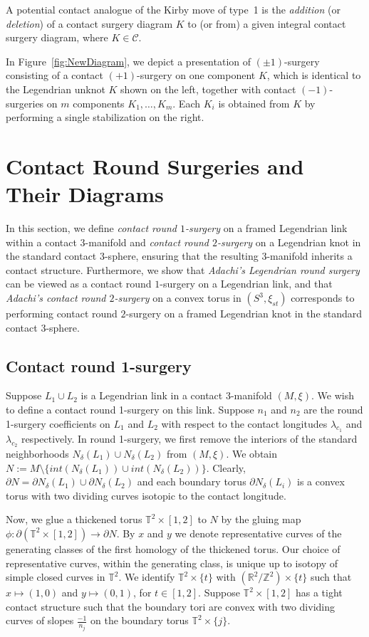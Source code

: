 \documentclass{amsart}
\theoremstyle{plain}
\theoremstyle{remark}
\theoremstyle{definition}
\newcommand{\dd}{\partial}
\begin{document}
A potential contact analogue of the Kirby move of type~1 is the \textit{addition} (or \textit{deletion}) of a contact surgery diagram $K$ to (or from) a given integral contact surgery diagram, where $K \in \mathcal{C}$.


In Figure~\ref{fig:NewDiagram}, we depict a presentation of $(\pm1)$-surgery  consisting of a contact $(+1)$-surgery on one component $K$, which is identical to the Legendrian unknot $K$ shown on the left, together with contact $(-1)$-surgeries on $m$ components $K_1, \ldots, K_m$. 
Each $K_i$ is obtained from $K$ by performing a single stabilization on the right.

\section{Contact Round Surgeries and Their Diagrams}\label{sec: ContSurDia}
In this section, we define \emph{contact round $1$-surgery} on a framed Legendrian link within a contact $3$-manifold and \emph{contact round $2$-surgery} on a Legendrian knot in the standard contact $3$-sphere, ensuring that the resulting $3$-manifold inherits a contact structure. 
Furthermore, we show that \emph{Adachi’s Legendrian round surgery} can be viewed as a contact round $1$-surgery on a Legendrian link, and that \emph{Adachi’s contact round $2$-surgery} on a convex torus in $(S^3, \xi_{st})$ corresponds to performing contact round $2$-surgery on a framed Legendrian knot in the standard contact $3$-sphere.

\subsection{Contact round 1-surgery}\label{subsec: CR1S}
Suppose $L_1 \cup L_2$ is a Legendrian link in a contact 3-manifold $(M, \xi)$. 
We wish to define a contact round 1-surgery on this link. 
Suppose $n_1$ and $n_2$ are the round 1-surgery coefficients on $L_1$ and $L_2$ with respect to the contact longitudes $\lambda_{c_1}$ and $\lambda_{c_2}$ respectively. 
In round 1-surgery, we first remove the interiors of the standard neighborhoods $N_{\delta}(L_1)\cup N_{\delta}(L_2)$ from $(M, \xi)$.
We obtain $N:= M \setminus \{ int(N_{\delta}(L_1))\cup int(N_{\delta}(L_2))\} $. 
Clearly, $\dd N = \dd N_{\delta}(L_1) \cup \dd N_{\delta}(L_2)$ and each boundary torus $\dd N_{\delta}(L_i)$ is a convex torus with two dividing curves isotopic to the contact longitude.


Now, we glue a thickened torus $\mathbb{T}^2 \times [1,2]$ to $N$ by the gluing map $\phi: \dd(\mathbb{T}^2\times [1,2]) \to \dd N$.
By $x$ and $y$ we denote representative curves of the generating classes of the first homology of the thickened torus. Our choice of representative curves, within the generating class, is unique up to isotopy of simple closed curves in $\mathbb{T}^2$.
We identify $\mathbb{T}^2 \times \{t\}$ with $(\mathbb{R}^2/\mathbb{Z}^2)\times \{t\}$ such that $x \mapsto (1,0)$ and $y\mapsto (0,1)$, for $t\in [1,2]$.
Suppose $\mathbb{T}^2 \times [1,2]$ has a tight contact structure such that the boundary tori are convex with two dividing curves of slopes $\frac{-1}{n_j}$ on the boundary torus $\mathbb{T}^2 \times \{j\}$. 
\end{document}
